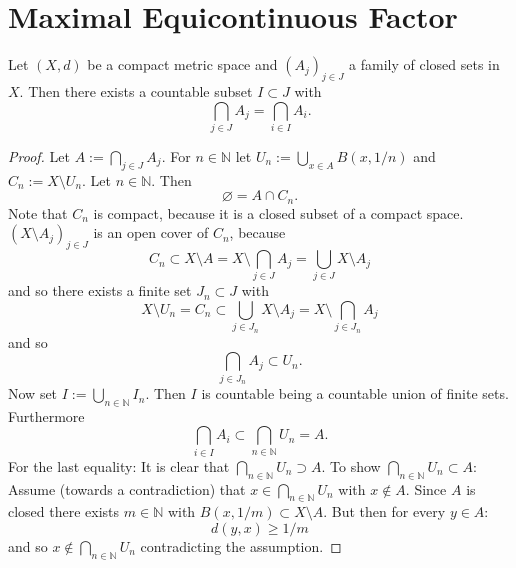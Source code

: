 \section{Maximal Equicontinuous Factor}
\begin{lemma}
  \label{lem:countableSubIntersection}
  Let $(X,d)$ be a compact metric space and $(A_j)_{j \in J}$ a family of closed sets in $X$.
  Then there exists a countable subset $I \subset J$ with
  \begin{equation*}
    \bigcap_{j \in J} A_j = \bigcap_{i \in I} A_{i}.
  \end{equation*}
\end{lemma}
\begin{proof}
Let $A:=\bigcap_{j \in J} A_j$.
  For $n \in \mathbb{N}$ let $U_n := \bigcup_{ x \in A} B(x, 1/n)$ and $C_n := X \setminus U_n$.
  Let $n \in \mathbb{N}$. Then
  \begin{equation*}
    \varnothing =  A \cap C_n.
  \end{equation*}
  Note that $C_n$ is compact, because it is a closed subset of a compact space.
  $(X \setminus A_j)_{j \in J}$ is an open cover of $C_n$,
  because
  \begin{equation*}
    C_n \subset X \setminus A = X \setminus \bigcap_{j \in J} A_j = \bigcup_{j \in J} X \setminus A_j
  \end{equation*}
  and so there exists a finite set $J_n \subset J$ with
  \begin{equation*}
    X \setminus U_n = C_n \subset \bigcup_{j \in J_n} X \setminus A_j = X \setminus \bigcap_{j \in J_n} A_j
  \end{equation*}
  and so
  \begin{equation*}
 \bigcap_{j \in J_n} A_j \subset U_n.
  \end{equation*}
  Now set $I := \bigcup_{n \in \mathbb{N}} I_n$.
  Then $I$ is countable being a countable union of finite sets.
  Furthermore
  \begin{equation*}
    \bigcap_{i \in I} A_i \subset \bigcap_{n \in \mathbb{N}} U_n = A.
  \end{equation*}
  For the last equality: It is clear that $\bigcap_{n \in \mathbb{N}} U_n \supset A$.
  To show $\bigcap_{n \in \mathbb{N}}U_n \subset A$:
  Assume (towards a contradiction) that $x \in \bigcap_{n \in \mathbb{N}}U_n $ with $x \notin A$.
  Since $A$ is closed there exists $m \in \mathbb{N}$ with $B(x,1/m) \subset X \setminus A$.
  But then for every $y \in A$:
  \begin{equation*}
    d(y,x) \geq 1/m
  \end{equation*}
  and so $x \notin \bigcap_{n \in \mathbb{N}}U_n$ contradicting the assumption.
\end{proof}
